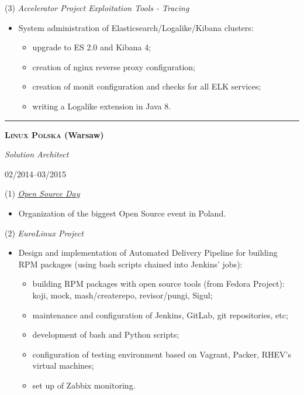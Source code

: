 \documentclass[$fontsize$, a4paper]{article}
\newcommand\textbox[1]{%
  \parbox{.333\textwidth}{#1}%
}
\begin{document}
\vspace{10pt}
(3) \emph{Accelerator Project Exploitation Tools - Tracing}
\begin{itemize}
  \item System administration of Elasticsearch/Logalike/Kibana clusters:
  \begin{itemize}
    \item upgrade to ES 2.0 and Kibana 4;
    \item creation of nginx reverse proxy configuration;
    \item creation of monit configuration and checks for all ELK services;
    \item writing a Logalike extension in Java 8.
  \end{itemize}
\end{itemize}


\noindent\rule[0.5ex]{\linewidth}{1pt}

\noindent\textbox{\textbf{\textsc{Linux Polska} (Warsaw)}\hfill}\textbox{\hfil \emph{Solution Architect}\hfil}\textbox{\hfill 02/2014--03/2015}

\vspace{10pt}
(1) \emph{\href{http://opensourceday.com/}{Open Source Day}}
\begin{itemize}
  \item Organization of the biggest Open Source event in Poland.
\end{itemize}

(2) \emph{EuroLinux Project}
\begin{itemize}
  \item Design and implementation of Automated Delivery Pipeline for building RPM packages (using bash scripts chained into Jenkins' jobs):

  \begin{itemize}
  \item building RPM packages with open source tools (from Fedora Project):
  koji, mock, mash/createrepo, revisor/pungi, Sigul;
  \item maintenance and configuration of Jenkins, GitLab, git repositories, etc;
  \item development of bash and Python scripts;
  \item configuration of testing environment based on Vagrant, Packer, RHEV's virtual machines;
  \item set up of Zabbix monitoring.
  \end{itemize}

\end{itemize}
\end{document}
